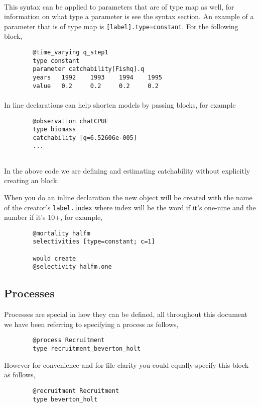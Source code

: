 \paragraph*{\label{sec:params}}
This syntax can be applied to parameters that are of type map as well, for information on what type a parameter is see the syntax section. An example of a parameter that is of type map is \texttt{[label].type=constant}. For the following  block,

{\small{\begin{verbatim}
		@time_varying q_step1
		type constant
		parameter catchability[Fishq].q
		years 	1992	1993	1994	1995
		value 	0.2		0.2		0.2		0.2	
		\end{verbatim}}}


\paragraph*{\label{sec:declare}}
In line declarations can help shorten models by passing \command{} blocks, for example 
{\small{\begin{verbatim}
		@observation chatCPUE
		type biomass
		catchability [q=6.52606e-005]
		...
		
		\end{verbatim}}}

In the above code we are defining and estimating catchability without explicitly creating an  block.

When you do an inline declaration the new object will be created with the name of the creator's \texttt{label.index} where index will be the word if it's one-nine and the number if it's 10+, for example,
{\small{\begin{verbatim}
		@mortality halfm
		selectivities [type=constant; c=1]
		
		would create
		@selectivity halfm.one
		\end{verbatim}}}



\subsection{Processes}
Processes are special in how they can be defined, all throughout this document we have been referring to specifying a process as follows,

{\small{\begin{verbatim}
		@process Recruitment
		type recruitment_beverton_holt
		\end{verbatim}}}
However for convenience and for file clarity you could equally specify this block as follows,
{\small{\begin{verbatim}
		@recruitment Recruitment
		type beverton_holt
		\end{verbatim}}}

